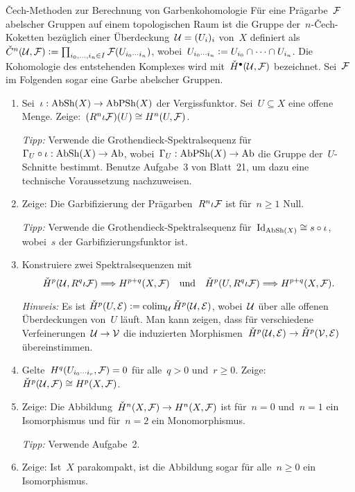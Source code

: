 \documentclass{uebblatt}
\begin{document}

\begin{aufgabe}{Čech-Methoden zur Berechnung von Garbenkohomologie}
Für eine Prägarbe~$\mathcal{F}$ abelscher Gruppen auf einem topologischen Raum ist die
Gruppe der~$n$-Čech-Koketten bezüglich einer Überdeckung~$\mathcal{U} = (U_i)_i$ von~$X$
definiert als~$\check C^n(\mathcal{U}, \mathcal{F}) \vcentcolon= \prod_{i_0,\ldots,i_n \in I}
\mathcal{F}(U_{i_0 \cdots i_n})$, wobei~$U_{i_0 \cdots i_n} \vcentcolon= U_{i_0} \cap \cdots
\cap U_{i_n}$. Die Kohomologie des entstehenden Komplexes wird mit~$\check
H^\bullet(\mathcal{U}, \mathcal{F})$ bezeichnet. Sei~$\mathcal{F}$ im Folgenden sogar eine Garbe abelscher Gruppen.
\begin{enumerate}
\item Sei~$\iota : \mathrm{AbSh}(X) \to
\mathrm{AbPSh}(X)$ der Vergissfunktor. Sei~$U \subseteq X$ eine offene Menge.
Zeige:~$(R^n \iota\mathcal{F})(U) \cong H^n(U, \mathcal{F})$.

{\tiny\emph{Tipp:} Verwende die Grothendieck-Spektralsequenz für~$\Gamma_U
\circ \iota : \mathrm{AbSh}(X) \to \mathrm{Ab}$, wobei~$\Gamma_U : \mathrm{AbPSh}(X) \to \mathrm{Ab}$ die
Gruppe der~$U$-Schnitte bestimmt. Benutze Aufgabe~3 von Blatt~21, um dazu eine
technische Voraussetzung nachzuweisen.\par}
\item Zeige: Die Garbifizierung der Prägarben~$R^n \iota \mathcal{F}$ ist für~$n \geq 1$
Null.

{\tiny\emph{Tipp:} Verwende die Grothendieck-Spektralsequenz
für~$\mathrm{Id}_{\mathrm{AbSh}(X)} \cong s \circ \iota$, wobei~$s$ der Garbifizierungsfunktor
ist.\par}
\item Konstruiere zwei Spektralsequenzen mit
\[ \check H^p(\mathcal{U}, R^q \iota \mathcal{F}) \Longrightarrow H^{p+q}(X, \mathcal{F})
  \quad\text{und}\quad
  \check H^p(U, R^q \iota \mathcal{F}) \Longrightarrow H^{p+q}(X, \mathcal{F}). \]
{\tiny\emph{Hinweis:} Es ist $\check H^p(U,\mathcal{E}) \vcentcolon= \operatorname{colim}_{\mathcal{U}} \check H^p(\mathcal{U},\mathcal{E})$,
wobei~$\mathcal{U}$ über alle offenen Überdeckungen von~$U$ läuft. Man kann zeigen, dass
für verschiedene Verfeinerungen~$\mathcal{U} \to \mathcal{V}$ die induzierten
Morphismen~$\check H^p(\mathcal{U},\mathcal{E}) \to \check H^p(\mathcal{V},\mathcal{E})$ übereinstimmen.\par}
\item Gelte~$H^q(U_{i_0 \cdots i_r}, \mathcal{F}) = 0$ für alle~$q > 0$ und~$r \geq 0$.
Zeige: $\check H^p(\mathcal{U}, \mathcal{F}) \cong H^p(X, \mathcal{F})$.
\item Zeige: Die Abbildung~$\check H^n(X,\mathcal{F}) \to H^n(X,\mathcal{F})$ ist für~$n = 0$
und~$n = 1$ ein Isomorphismus und für~$n = 2$ ein Monomorphismus.
{\tiny\emph{Tipp:} Verwende Aufgabe~2.\par}
\item Zeige: Ist~$X$ parakompakt, ist die Abbildung sogar für alle~$n \geq 0$ ein
Isomorphismus.


\end{enumerate}
\end{aufgabe}
\end{document}
